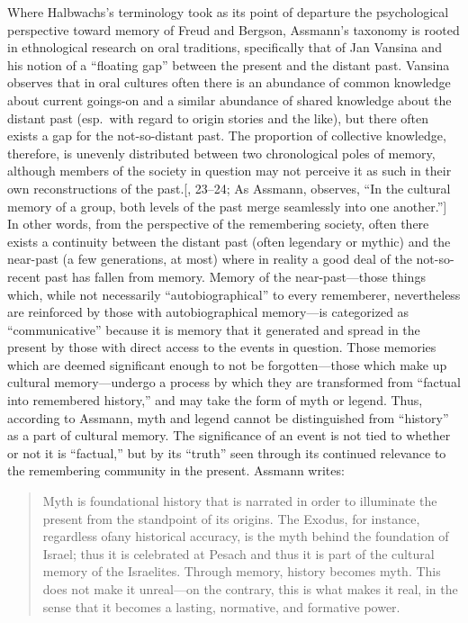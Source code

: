 Where Halbwachs's terminology took as its point of departure the
psychological perspective toward memory of
Freud\autocite{terdiman_radstone-schwarz2011} and
Bergson\autocite{ansellpearson_radstone-schwarz2011}, Assmann's taxonomy
is rooted in ethnological research on oral traditions, specifically that
of Jan Vansina and his notion of a ``floating gap'' between the present
and the distant past.\autocite{vansina1985} Vansina observes that in
oral cultures often there is an abundance of common knowledge about
current goings-on and a similar abundance of shared knowledge about the
distant past (esp.~with regard to origin stories and the like), but
there often exists a gap for the not-so-distant past. The proportion of
collective knowledge, therefore, is unevenly distributed between two
chronological poles of memory, although members of the society in
question may not perceive it as such in their own reconstructions of the
past.{[}\textcite{vansina1985}, 23--24; As Assmann, observes, ``In the
cultural memory of a group, both levels of the past merge seamlessly
into one another.''{]} In other words, from the perspective of the
remembering society, often there exists a continuity between the distant
past (often legendary or mythic) and the near-past (a few generations,
at most) where in reality a good deal of the not-so-recent past has
fallen from memory. Memory of the near-past---those things which, while
not necessarily ``autobiographical'' to every rememberer, nevertheless
are reinforced by those with autobiographical memory---is categorized as
``communicative'' because it is memory that it generated and spread in
the present by those with direct access to the events in question. Those
memories which are deemed significant enough to not be forgotten---those
which make up cultural memory---undergo a process by which they are
transformed from ``factual into remembered history,'' and may take the
form of myth or legend.\autocite[37--38]{assmann2011} Thus, according to
Assmann, myth and legend cannot be distinguished from ``history'' as a
part of cultural memory. The significance of an event is not tied to
whether or not it is ``factual,'' but by its ``truth'' seen through its
continued relevance to the remembering community in the present. Assmann
writes:

\begin{quote}
Myth is foundational history that is narrated in order to illuminate the
present from the standpoint of its origins. The Exodus, for instance,
regardless ofany historical accuracy, is the myth behind the foundation
of Israel; thus it is celebrated at Pesach and thus it is part of the
cultural memory of the Israelites. Through memory, history becomes myth.
This does not make it unreal---on the contrary, this is what makes it
real, in the sense that it becomes a lasting, normative, and formative
power.\autocite[38]{assmann2011}
\end{quote}

